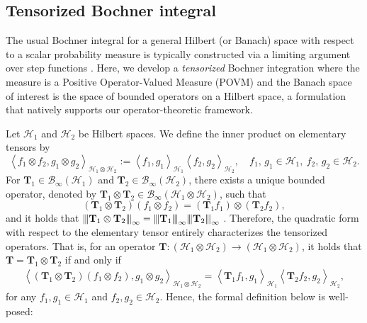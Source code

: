 \documentclass[noinfoline]{imsart}\setcounter{tocdepth}{2}
\newcommand{\m}[1]{\mathbf{#1}} %
\renewcommand{\c}[1]{\mathcal{#1}} %
\newcommand{\vertiii}[1]{{\left\vert\kern-0.25ex\left\vert\kern-0.25ex\left\vert #1 
    \right\vert\kern-0.25ex\right\vert\kern-0.25ex\right\vert}} %
\newcommand{\innpr}[2]{{\left\langle {#1},{#2}\right\rangle}} %
\theoremstyle{plain}
\begin{document}
\begin{appendix}



\section{Tensorized Bochner integral}\label{sec:tens:boch}
The usual Bochner integral for a general Hilbert (or Banach) space with respect to a scalar probability measure is typically constructed via a limiting argument over step functions \cite{yosida2012functional, hsing2015theoretical}. Here, we develop a \emph{tensorized} Bochner integration where the measure is a Positive Operator-Valued Measure (POVM) and the Banach space of interest is the space of bounded operators on a Hilbert space, a formulation that natively supports our operator-theoretic framework.

Let $\c{H}_{1}$ and $\c{H}_{2}$ be Hilbert spaces. We define the inner product on elementary tensors by
\begin{equation*}
    \innpr{f_{1} \otimes f_{2}}{g_{1} \otimes g_{2}}_{\c{H}_{1} \otimes \c{H}_{2}} := \innpr{f_{1}}{g_{1}}_{\c{H}_{1}} \innpr{f_{2}}{g_{2}}_{\c{H}_{2}},  \quad f_{1}, \, g_{1} \in \c{H}_{1}, \ f_{2}, \, g_{2} \in \c{H}_{2}.
\end{equation*}
For $\m{T}_{1} \in \c{B}_{\infty}(\c{H}_{1})$ and $\m{T}_{2} \in \c{B}_{\infty}(\c{H}_{2})$, there exists a unique bounded operator, denoted by $\m{T}_{1} \otimes \m{T}_{2} \in \c{B}_{\infty}(\c{H}_{1} \otimes \c{H}_{2})$, such that
\begin{equation*}
    (\m{T}_{1} \otimes \m{T}_{2})(f_{1} \otimes f_{2}) = (\m{T}_{1} f_{1}) \otimes (\m{T}_{2} f_{2}),
\end{equation*}
and it holds that $\vertiii{\m{T}_{1} \otimes \m{T}_{2}}_{\infty} = \vertiii{\m{T}_{1}}_{\infty} \vertiii{\m{T}_{2}}_{\infty}$ \cite[Proposition A.67]{hall2013quantum}. Therefore, the quadratic form with respect to the elementary tensor entirely characterizes the tensorized operators. That is, for an operator $\m{T}: (\c{H}_{1} \otimes \c{H}_{2}) \to (\c{H}_{1} \otimes \c{H}_{2})$, it holds that $\m{T} = \m{T}_{1} \otimes \m{T}_{2}$ if and only if
\begin{align*}
    \innpr{(\m{T}_{1} \otimes \m{T}_{2}) (f_{1} \otimes f_{2})}{g_{1} \otimes g_{2}}_{\c{H}_{1} \otimes \c{H}_{2}} = \innpr{\m{T}_{1} f_{1}}{g_{1}}_{\c{H}_{1}} \innpr{\m{T}_{2} f_{2}}{g_{2}}_{\c{H}_{2}},
\end{align*}
for any $f_{1}, g_{1} \in \c{H}_{1}$ and $f_{2}, g_{2} \in \c{H}_{2}$. Hence, the formal definition below is well-posed:


\end{appendix}
\end{document}
